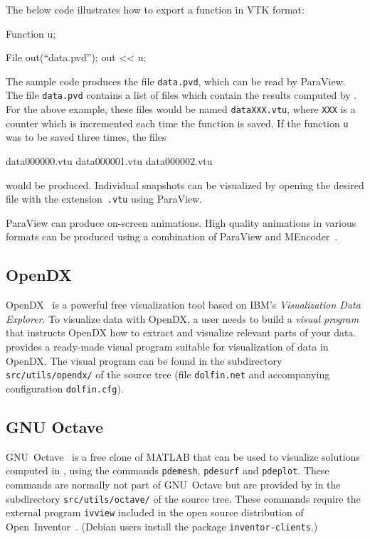 The below code illustrates how to export a function in VTK format:
\begin{code}
  Function u;

  File out(``data.pvd'');
  out << u;
\end{code}
The sample code produces the file \texttt{data.pvd}, which can be read 
by ParaView. The file \texttt{data.pvd} contains a list of files which 
contain the results computed by \dolfin{}. For the above example, these 
files would be named \texttt{dataXXX.vtu}, where \texttt{XXX} is a counter 
which is incremented each time the function is saved. If the function 
\texttt{u} was to be saved three times, the files
\begin{code}
  data000000.vtu
  data000001.vtu
  data000002.vtu
\end{code}
would be produced. Individual snapshots can be visualized by opening the 
desired file with the extension~\texttt{.vtu} using ParaView.

ParaView can produce on-screen animations. High quality animations 
in various formats can be produced using a combination of ParaView and 
MEncoder~\cite{www:MEncoder}.



\subsection{OpenDX}

OpenDX~\cite{www:OpenDX} is a powerful free visualization tool based
on IBM's \emph{Visualization Data Explorer}. To visualize data with
OpenDX, a user needs to build a \emph{visual program} that instructs
OpenDX how to extract and visualize relevant parts of your
data. \dolfin{} provides a ready-made visual program suitable for
visualization of \dolfin{} data in OpenDX. The visual program can be
found in the subdirectory \texttt{src/utils/opendx/} of the \dolfin{}
source tree (file \texttt{dolfin.net} and accompanying configuration
\texttt{dolfin.cfg}).

\subsection{GNU Octave}

GNU~Octave~\cite{www:Octave} is a free clone of MATLAB that can be
used to visualize solutions computed in \dolfin{}, using the commands
\texttt{pdemesh}, \texttt{pdesurf} and \texttt{pdeplot}. These
commands are normally not part of GNU~Octave but are
provided by \dolfin{} in the subdirectory \texttt{src/utils/octave/} of
the \dolfin{} source tree. These commands require the external program
\texttt{ivview} included in the open source distribution of
Open~Inventor~\cite{www:OpenInventor}. (Debian users install the
package \texttt{inventor-clients}.)

